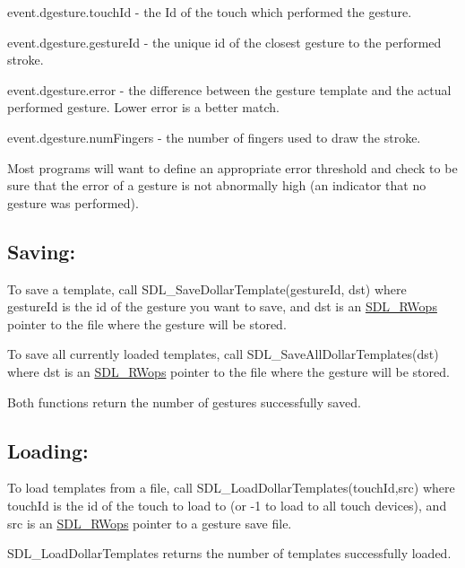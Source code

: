 \begin{DoxyItemize}
\item event.\+dgesture.\+touch\+Id -\/ the Id of the touch which performed the gesture.
\item event.\+dgesture.\+gesture\+Id -\/ the unique id of the closest gesture to the performed stroke.
\item event.\+dgesture.\+error -\/ the difference between the gesture template and the actual performed gesture. Lower error is a better match.
\item event.\+dgesture.\+num\+Fingers -\/ the number of fingers used to draw the stroke.
\end{DoxyItemize}

Most programs will want to define an appropriate error threshold and check to be sure that the error of a gesture is not abnormally high (an indicator that no gesture was performed).

\subsection*{Saving\+: }

To save a template, call S\+D\+L\+\_\+\+Save\+Dollar\+Template(gesture\+Id, dst) where gesture\+Id is the id of the gesture you want to save, and dst is an \mbox{\hyperlink{struct_s_d_l___r_wops}{S\+D\+L\+\_\+\+R\+Wops}} pointer to the file where the gesture will be stored.

To save all currently loaded templates, call S\+D\+L\+\_\+\+Save\+All\+Dollar\+Templates(dst) where dst is an \mbox{\hyperlink{struct_s_d_l___r_wops}{S\+D\+L\+\_\+\+R\+Wops}} pointer to the file where the gesture will be stored.

Both functions return the number of gestures successfully saved.

\subsection*{Loading\+: }

To load templates from a file, call S\+D\+L\+\_\+\+Load\+Dollar\+Templates(touch\+Id,src) where touch\+Id is the id of the touch to load to (or -\/1 to load to all touch devices), and src is an \mbox{\hyperlink{struct_s_d_l___r_wops}{S\+D\+L\+\_\+\+R\+Wops}} pointer to a gesture save file.

S\+D\+L\+\_\+\+Load\+Dollar\+Templates returns the number of templates successfully loaded.



